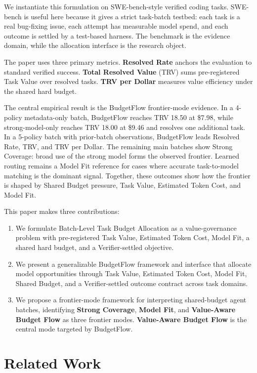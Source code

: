 \documentclass[sigconf,review,anonymous]{acmart}
\newcommand{\method}{BudgetFlow\xspace}
\newcommand{\trv}{TRV\xspace}
\newcommand{\taskvalue}{Task Value\xspace}
\newcommand{\tokencost}{Estimated Token Cost\xspace}
\newcommand{\modelfit}{Model Fit\xspace}
\newcommand{\sharedbudget}{Shared Budget\xspace}
\newcommand{\verifier}{Verifier\xspace}
\begin{document}
We instantiate this formulation on SWE-bench-style verified coding tasks. SWE-bench is useful here because it gives a strict task-batch testbed: each task is a real bug-fixing issue, each attempt has measurable model spend, and each outcome is settled by a test-based harness. The benchmark is the evidence domain, while the allocation interface is the research object.

The paper uses three primary metrics. \textbf{Resolved Rate} anchors the evaluation to standard verified success. \textbf{Total Resolved Value} (\trv) sums pre-registered \taskvalue over resolved tasks. \textbf{\trv per Dollar} measures value efficiency under the shared hard budget.

The central empirical result is the \method frontier-mode evidence. In a 4-policy metadata-only batch, \method reaches \trv 18.50 at \$7.98, while strong-model-only reaches \trv 18.00 at \$9.46 and resolves one additional task. In a 5-policy batch with prior-batch observations, \method leads Resolved Rate, \trv, and \trv per Dollar. The remaining main batches show Strong Coverage: broad use of the strong model forms the observed frontier. Learned routing remains a Model Fit reference for cases where accurate task-to-model matching is the dominant signal. Together, these outcomes show how the frontier is shaped by \sharedbudget pressure, \taskvalue, \tokencost, and \modelfit.

This paper makes three contributions:

\begin{enumerate}
    \item We formulate Batch-Level Task Budget Allocation as a value-governance problem with pre-registered \taskvalue, \tokencost, \modelfit, a shared hard budget, and a \verifier-settled objective.
    \item We present a generalizable \method framework and interface that allocate model opportunities through \taskvalue, \tokencost, \modelfit, \sharedbudget, and a \verifier-settled outcome contract across task domains.
    \item We propose a frontier-mode framework for interpreting shared-budget agent batches, identifying \textbf{Strong Coverage}, \textbf{Model Fit}, and \textbf{Value-Aware Budget Flow} as three frontier modes. \textbf{Value-Aware Budget Flow} is the central mode targeted by \method.
\end{enumerate}

\section{Related Work}
\label{sec:related}
\end{document}
